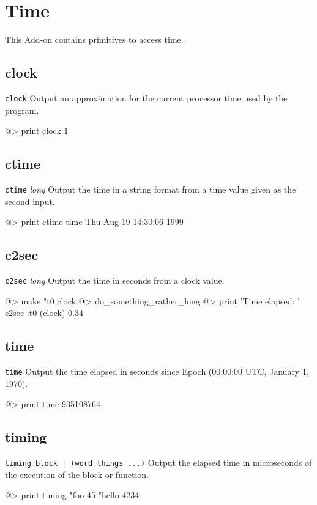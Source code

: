 \section{Time} 

This Add-on contains primitives to access time.

\subsection*{clock}  
 
{\tt clock} 
\newline\newline
Output an approximation for the current processor time used by the program.
\begin{verbatimtab} 
@> print clock
1
\end{verbatimtab}

\subsection*{ctime}  
 
{\tt ctime} {\it long}
\newline\newline
Output the time in a string format from a time value given as the second input.
\begin{verbatimtab} 
@> print ctime time
Thu Aug 19 14:30:06 1999
\end{verbatimtab}

\subsection*{c2sec}  
 
{\tt c2sec} {\it long}
\newline\newline
Output the time in seconds from a clock value.
\begin{verbatimtab} 
@> make "t0 clock
@> do_something_rather_long
@> print 'Time elapsed: ' c2sec :t0-(clock)
0.34
\end{verbatimtab}

\subsection*{time}  
 
{\tt time} 
\newline\newline
Output the time elapsed in seconds since Epoch (00:00:00 UTC, January 1, 1970).
\begin{verbatimtab} 
@> print time
935108764
\end{verbatimtab}

\subsection*{timing}  
 
{\tt timing block | (word things ...)} 
\newline\newline
Output the elapsed time in microseconds of the execution of the block or function.
\begin{verbatimtab} 
@> print timing "foo 45 "hello
4234
\end{verbatimtab}
